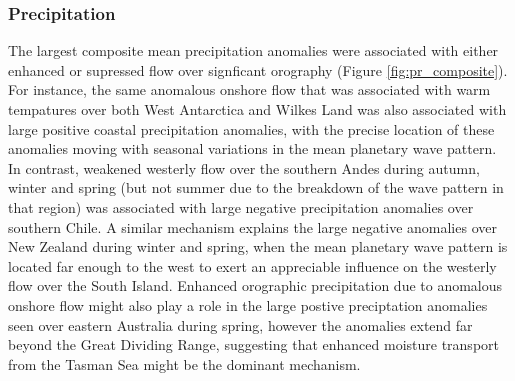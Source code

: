 \subsubsection{Precipitation}

The largest composite mean precipitation anomalies were associated with either enhanced or supressed flow over signficant orography (Figure \ref{fig:pr_composite}). For instance, the same anomalous onshore flow that was associated with warm tempatures over both West Antarctica and Wilkes Land was also associated with large positive coastal precipitation anomalies, with the precise location of these anomalies moving with seasonal variations in the mean planetary wave pattern. In contrast, weakened westerly flow over the southern Andes during autumn, winter and spring (but not summer due to the breakdown of the wave pattern in that region) was associated with large negative precipitation anomalies over southern Chile. A similar mechanism explains the large negative anomalies over New Zealand during winter and spring, when the mean planetary wave pattern is located far enough to the west to exert an appreciable influence on the westerly flow over the South Island. Enhanced orographic precipitation due to anomalous onshore flow might also play a role in the large postive preciptation anomalies seen over eastern Australia during spring, however the anomalies extend far beyond the Great Dividing Range, suggesting that enhanced moisture transport from the Tasman Sea might be the dominant mechanism. 
